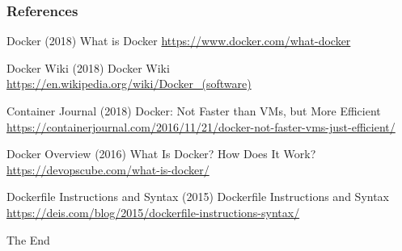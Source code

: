 \documentclass{beamer}
\begin{document}
\begin{frame}
\frametitle{References}
\footnotesize{
\begin{thebibliography}{99} %
 Docker (2018)
\newblock What is Docker
\newblock \href{https://www.docker.com/what-docker}{https://www.docker.com/what-docker} 

 Docker Wiki (2018)
\newblock Docker Wiki
\newblock \href{https://en.wikipedia.org/wiki/Docker_(software)}{https://en.wikipedia.org/wiki/Docker\_(software)} 

 Container Journal (2018)
\newblock Docker: Not Faster than VMs, but More Efficient
\newblock \href{https://containerjournal.com/2016/11/21/docker-not-faster-vms-just-efficient/}{https://containerjournal.com/2016/11/21/docker-not-faster-vms-just-efficient/} 

 Docker Overview (2016)
\newblock What Is Docker? How Does It Work?
\newblock \href{https://devopscube.com/what-is-docker/}{https://devopscube.com/what-is-docker/} 

 Dockerfile Instructions and Syntax (2015)
\newblock Dockerfile Instructions and Syntax
\newblock \href{https://deis.com/blog/2015/dockerfile-instructions-syntax/}{https://deis.com/blog/2015/dockerfile-instructions-syntax/} 

\end{thebibliography}
}
\end{frame}


\begin{frame}
\Huge{\centerline{The End}}
\end{frame}

\end{document}

